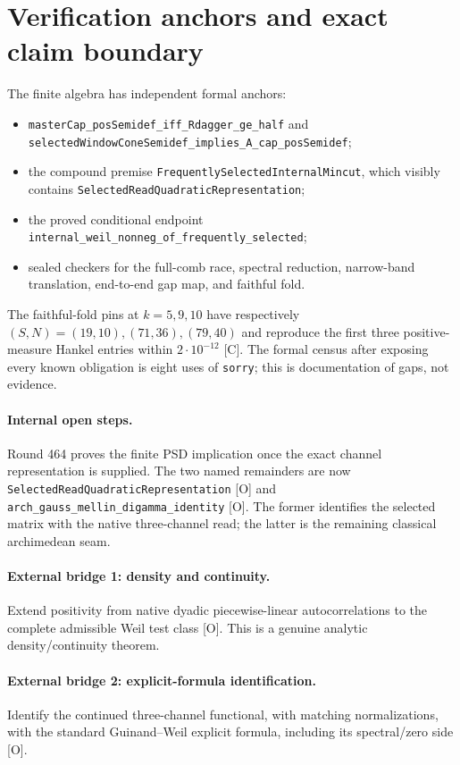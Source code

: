 \documentclass[11pt]{article}
\newcommand{\Cgrade}{\textnormal{\small[C]}}
\newcommand{\Ograde}{\textnormal{\small[O]}}
\newcommand{\code}[1]{\nolinkurl{#1}}
\begin{document}
\section{Verification anchors and exact claim boundary}

The finite algebra has independent formal anchors:
\begin{itemize}
\item \code{masterCap_posSemidef_iff_Rdagger_ge_half} and
\code{selectedWindowConeSemidef_implies_A_cap_posSemidef};
\item the compound premise
\code{FrequentlySelectedInternalMincut}, which visibly contains
\code{SelectedReadQuadraticRepresentation};
\item the proved conditional endpoint
\code{internal_weil_nonneg_of_frequently_selected};
\item sealed checkers for the full-comb race, spectral reduction,
narrow-band translation, end-to-end gap map, and faithful fold.
\end{itemize}
The faithful-fold pins at $k=5,9,10$ have respectively
$(S,N)=(19,10),(71,36),(79,40)$ and reproduce the first three
positive-measure Hankel entries within $2\cdot10^{-12}$ \Cgrade.
The formal census after exposing every known obligation is eight
uses of \code{sorry}; this is documentation of gaps, not evidence.

\paragraph{Internal open steps.}
Round 464 proves the finite PSD implication once the exact channel
representation is supplied.  The two named remainders are now
\code{SelectedReadQuadraticRepresentation} \Ograde{} and
\code{arch_gauss_mellin_digamma_identity} \Ograde.  The former
identifies the selected matrix with the native three-channel read;
the latter is the remaining classical archimedean seam.

\paragraph{External bridge 1: density and continuity.}
Extend positivity from native dyadic piecewise-linear
autocorrelations to the complete admissible Weil test class
\Ograde.  This is a genuine analytic density/continuity theorem.

\paragraph{External bridge 2: explicit-formula identification.}
Identify the continued three-channel functional, with matching
normalizations, with the standard Guinand--Weil explicit formula,
including its spectral/zero side \Ograde.
\end{document}
